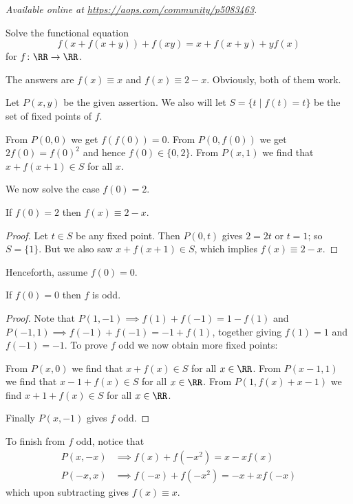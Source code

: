 \textsl{Available online at \url{https://aops.com/community/p5083463}.}
\begin{mdframed}[style=mdpurplebox,frametitle={Problem statement}]
Solve the functional equation
\[ f(x+f(x+y)) + f(xy) = x + f(x+y) + yf(x) \]
for $f \colon \RR \to \RR$.
\end{mdframed}
The answers are $f(x) \equiv x$ and $f(x) \equiv 2-x$.
Obviously, both of them work.

Let $P(x,y)$ be the given assertion.
We also will let $S = \{t \mid f(t) = t\}$
be the set of fixed points of $f$.
\begin{itemize}
  \ii From $P(0,0)$ we get $f(f(0)) = 0$.
  \ii From $P(0,f(0))$ we get $2f(0) = f(0)^2$
  and hence $f(0) \in \{0,2\}$.
  \ii From $P(x,1)$
  we find that $x+f(x+1) \in S$ for all $x$.
\end{itemize}

We now solve the case $f(0) = 2$.
\begin{claim*}
  If $f(0) = 2$ then $f(x) \equiv 2-x$.
\end{claim*}
\begin{proof}
  Let $t \in S$ be any fixed point.
  Then $P(0,t)$ gives $2 = 2t$ or $t = 1$;
  so $S = \{1\}$.
  But we also saw $x+f(x+1) \in S$,
  which implies $f(x) \equiv 2-x$.
\end{proof}

Henceforth, assume $f(0) = 0$.
\begin{claim*}
  If $f(0) = 0$ then $f$ is odd.
\end{claim*}
\begin{proof}
  Note that $P(1,-1) \implies f(1) + f(-1) = 1 - f(1)$
  and $P(-1,1) \implies f(-1) + f(-1) = -1 + f(1)$,
  together giving $f(1) = 1$ and $f(-1) = -1$.
  To prove $f$ odd we now obtain more fixed points:
  \begin{itemize}
    \ii From $P(x,0)$ we find that $x+f(x) \in S$ for all $x \in \RR$.
    \ii From $P(x-1,1)$ we find that $x-1+f(x) \in S$ for all $x \in \RR$.
    \ii From $P(1, f(x)+x-1)$ we find $x+1+f(x) \in S$ for all $x \in \RR$.
  \end{itemize}
  Finally $P(x, -1)$ gives $f$ odd.
\end{proof}
To finish from $f$ odd, notice that
\begin{align*}
  P(x,-x) &\implies f(x) + f(-x^2) = x - xf(x) \\
  P(-x,x) &\implies f(-x) + f(-x^2) = -x + xf(-x)
\end{align*}
which upon subtracting gives $f(x) \equiv x$.
\pagebreak